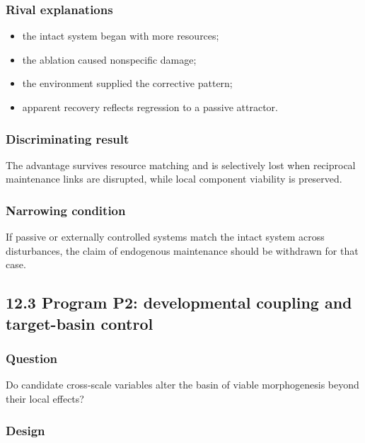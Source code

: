 \documentclass[
  11pt,
]{article}
\providecommand{\tightlist}{%
  \setlength{\itemsep}{0pt}\setlength{\parskip}{0pt}}
\begin{document}
\subsubsection{Rival explanations}\label{rival-explanations}

\begin{itemize}
\tightlist
\item
  the intact system began with more resources;
\item
  the ablation caused nonspecific damage;
\item
  the environment supplied the corrective pattern;
\item
  apparent recovery reflects regression to a passive attractor.
\end{itemize}

\subsubsection{Discriminating result}\label{discriminating-result}

The advantage survives resource matching and is selectively lost when
reciprocal maintenance links are disrupted, while local component
viability is preserved.

\subsubsection{Narrowing condition}\label{narrowing-condition}

If passive or externally controlled systems match the intact system
across disturbances, the claim of endogenous maintenance should be
withdrawn for that case.

\subsection{12.3 Program P2: developmental coupling and target-basin
control}\label{program-p2-developmental-coupling-and-target-basin-control}

\subsubsection{Question}\label{question-1}

Do candidate cross-scale variables alter the basin of viable
morphogenesis beyond their local effects?

\subsubsection{Design}\label{design-1}
\end{document}
